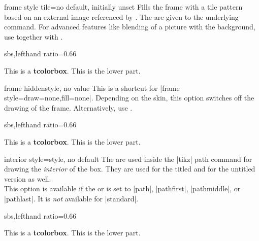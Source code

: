 \clearpage
\begin{docTcbKey}{frame style tile}{=}{no default, initially unset}
  Fills the frame with a tile pattern based on an external image referenced by .
  The  are given to the underlying  command.
  For advanced features like blending of a picture with the background,
  use  together with .
\begin{dispExample*}{sbs,lefthand ratio=0.66}

\begin{tcolorbox}[enhanced,title=My title,
  frame style tile={width=1cm}{pink_marble.png}]
This is a \textbf{tcolorbox}.
\tcblower
This is the lower part.
\end{tcolorbox}
\end{dispExample*}
\end{docTcbKey}


\begin{docTcbKey}{frame hidden}{}{style, no value}
  This is a shortcut for |frame style={draw=none,fill=none}|.
  Depending on the skin, this option switches off the drawing of the
  frame.
  Alternatively, use .
\begin{dispExample*}{sbs,lefthand ratio=0.66}

\begin{tcolorbox}[enhanced,title=My title,
  frame hidden]
This is a \textbf{tcolorbox}.
\tcblower
This is the lower part.
\end{tcolorbox}
\end{dispExample*}
\end{docTcbKey}


\begin{docTcbKey}{interior style}{=}{style, no default}
  The  are used inside the |tikz| path command
  for drawing the \emph{interior} of the box. They are used for the titled
  and for the untitled version as well.\\
  This option is available if the 
  or  is set to
  |path|, |pathfirst|, |pathmiddle|, or |pathlast|.
  It is \emph{not} available for |standard|.
\begin{dispExample*}{sbs,lefthand ratio=0.66}

\begin{tcolorbox}[enhanced,title=My title,
  interior style={left color=red!20!white,
                  right color=yellow!50!white}]
This is a \textbf{tcolorbox}.
\tcblower
This is the lower part.
\end{tcolorbox}
\end{dispExample*}
\end{docTcbKey}

